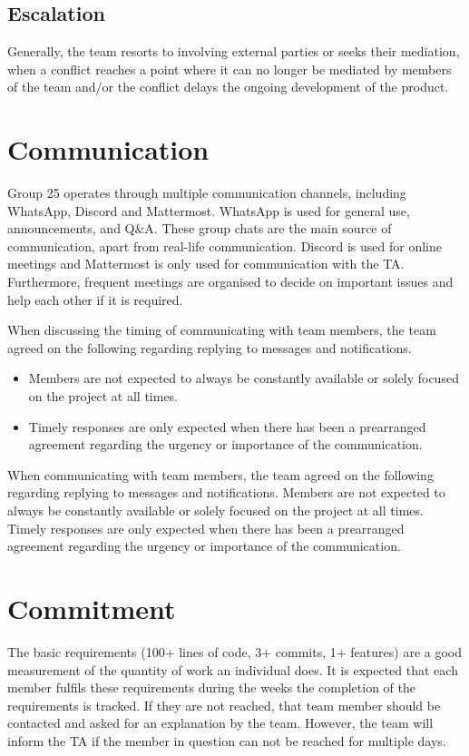 \documentclass[sigconf,nonacm]{acmart}
\begin{document}
\subsection{Escalation}
Generally, the team resorts to involving external parties or seeks their mediation, when a conflict reaches a point where it can no longer be mediated by members of the team and/or the conflict delays the ongoing development of the product.


\section{Communication}
Group 25 operates through multiple communication channels, including WhatsApp, Discord and Mattermost. WhatsApp is used for general use, announcements, and Q\&A. These group chats are the main source of communication, apart from real-life communication. Discord is used for online meetings and Mattermost is only used for communication with the TA. Furthermore, frequent meetings are organised to decide on important issues and help each other if it is required.

When discussing the timing of communicating with team members, the team agreed on the following regarding replying to messages and notifications.
\begin{itemize}
    \item Members are not expected to always be constantly available or solely focused on the project at all times.
    \item Timely responses are only expected when there has been a prearranged agreement regarding the urgency or importance of the communication.
\end{itemize}

When communicating with team members, the team agreed on the following regarding replying to messages and notifications. Members are not expected to always be constantly available or solely focused on the project at all times. Timely responses are only expected when there has been a prearranged agreement regarding the urgency or importance of the communication.


\section{Commitment}
The basic requirements (100+ lines of code, 3+ commits, 1+ features) are a good measurement of the quantity of work an individual does. It is expected that each member fulfils these requirements during the weeks the completion of the requirements is tracked. If they are not reached, that team member should be contacted and asked for an explanation by the team. However, the team will inform the TA if the member in question can not be reached for multiple days.
\end{document}
